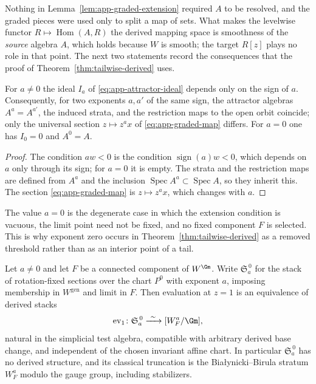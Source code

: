 Nothing in Lemma~\ref{lem:app-graded-extension} required \(A\) to be resolved,
and the graded pieces were used only to split a map of sets.  What makes the
levelwise functor \(R\mapsto\operatorname{Hom}(A,R)\) the derived mapping
space is smoothness of the \emph{source} algebra \(A\), which holds because
\(W\) is smooth; the target \(R[z]\) plays no role in that point.  The next two statements record the
consequences that the proof of Theorem~\ref{thm:tailwise-derived} uses.

\begin{lemma}
\label{lem:app-sign}
For \(a\neq0\) the ideal \(I_a\) of \eqref{eq:app-attractor-ideal} depends only
on the sign of \(a\).  Consequently, for two exponents \(a,a'\) of the same
sign, the attractor algebras \(A^a=A^{a'}\), the induced strata, and the
restriction maps to the open orbit coincide; only the universal section
\(z\mapsto z^ax\) of \eqref{eq:app-graded-map} differs.  For \(a=0\) one has
\(I_0=0\) and \(A^0=A\).
\end{lemma}

\begin{proof}
The condition \(aw<0\) is the condition \(\operatorname{sign}(a)w<0\), which
depends on \(a\) only through its sign; for \(a=0\) it is empty.  The strata
and the restriction maps are defined from \(A^a\) and the inclusion
\(\operatorname{Spec}A^a\subset\operatorname{Spec}A\), so they inherit this.
The section \eqref{eq:app-graded-map} is \(z\mapsto z^ax\), which changes with
\(a\).
\end{proof}

The value \(a=0\) is the degenerate case in which the extension condition is
vacuous, the limit point need not be fixed, and no fixed component \(F\) is
selected.  This is why exponent zero occurs in
Theorem~\ref{thm:tailwise-derived} as a removed threshold rather than as an
interior point of a tail.

\begin{proposition}
\label{prop:app-one-chart}
Let \(a\neq0\) and let \(F\) be a connected component of \(W^{\Gm}\).  Write
\(\mathfrak S^{\,0}_a\) for the stack of rotation-fixed sections over the chart
\(P^0\) with exponent \(a\), imposing membership in \(W^{\mathrm{gen}}\) and
limit in \(F\).  Then evaluation at \(z=1\) is an equivalence of derived stacks
\[
 \operatorname{ev}_1\colon\mathfrak S^{\,0}_a
 \xrightarrow{\ \sim\ }[W_F^a/\Gm],
\]
natural in the simplicial test algebra, compatible with arbitrary derived base
change, and independent of the chosen invariant affine chart.  In particular
\(\mathfrak S^{\,0}_a\) has no derived structure, and its classical truncation
is the Bia{\l}ynicki--Birula stratum \(W_F^a\) modulo the gauge group,
including stabilizers.
\end{proposition}

